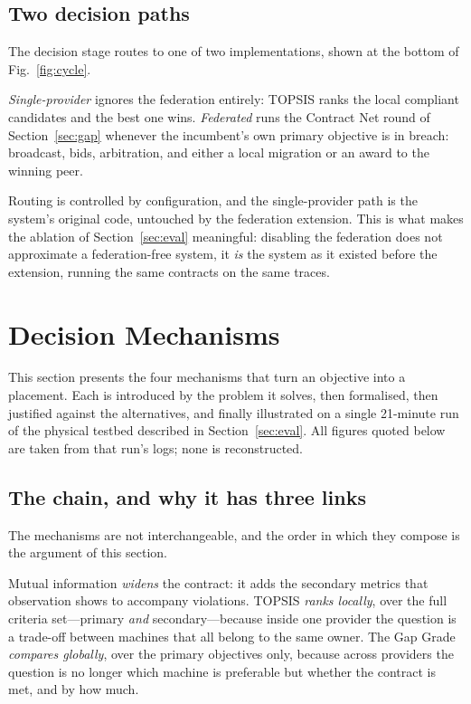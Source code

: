 \documentclass[conference]{IEEEtran}
\begin{document}
\subsection{Two decision paths}

The decision stage routes to one of two implementations, shown at the bottom
of Fig.~\ref{fig:cycle}.

\emph{Single-provider} ignores the federation entirely: TOPSIS ranks the local
compliant candidates and the best one wins.
\emph{Federated} runs the Contract Net round of
Section~\ref{sec:gap} whenever the incumbent's own primary objective is in
breach: broadcast, bids, arbitration, and either a local migration or an
award to the winning peer.

Routing is controlled by configuration, and the single-provider path is the
system's original code, untouched by the federation extension. This is what
makes the ablation of Section~\ref{sec:eval} meaningful: disabling the
federation does not approximate a federation-free system, it \emph{is} the
system as it existed before the extension, running the same contracts on the
same traces.

\section{Decision Mechanisms}
\label{sec:method}

This section presents the four mechanisms that turn an objective into a
placement. Each is introduced by the problem it solves, then formalised, then
justified against the alternatives, and finally illustrated on a single
21-minute run of the physical testbed described in
Section~\ref{sec:eval}. All figures quoted below are taken from that run's
logs; none is reconstructed.

\subsection{The chain, and why it has three links}
\label{sec:chain}

The mechanisms are not interchangeable, and the order in which they compose is
the argument of this section.

Mutual information \emph{widens} the contract: it adds the secondary metrics
that observation shows to accompany violations. TOPSIS \emph{ranks locally},
over the full criteria set---primary \emph{and} secondary---because inside one
provider the question is a trade-off between machines that all belong to the
same owner. The Gap Grade \emph{compares globally}, over the primary
objectives only, because across providers the question is no longer which
machine is preferable but whether the contract is met, and by how much.
\end{document}
